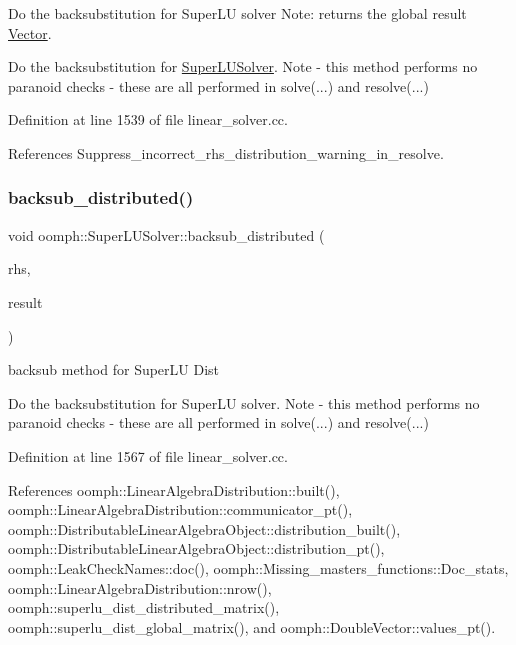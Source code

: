 Do the backsubstitution for Super\+LU solver Note\+: returns the global result \hyperlink{classoomph_1_1Vector}{Vector}. 

Do the backsubstitution for \hyperlink{classoomph_1_1SuperLUSolver}{Super\+L\+U\+Solver}. Note -\/ this method performs no paranoid checks -\/ these are all performed in solve(...) and resolve(...) 

Definition at line 1539 of file linear\+\_\+solver.\+cc.



References Suppress\+\_\+incorrect\+\_\+rhs\+\_\+distribution\+\_\+warning\+\_\+in\+\_\+resolve.

\mbox{\label{classoomph_1_1SuperLUSolver_a6f57fd508b25b730841de735bbea2b17}} 
\subsubsection{\texorpdfstring{backsub\+\_\+distributed()}{backsub\_distributed()}}
{\footnotesize\ttfamily void oomph\+::\+Super\+L\+U\+Solver\+::backsub\+\_\+distributed (\begin{DoxyParamCaption}\item[{const \hyperlink{classoomph_1_1DoubleVector}{Double\+Vector} \&}]{rhs,  }\item[{\hyperlink{classoomph_1_1DoubleVector}{Double\+Vector} \&}]{result }\end{DoxyParamCaption})\hspace{0.3cm}{\ttfamily [private]}}



backsub method for Super\+LU Dist 

Do the backsubstitution for Super\+LU solver. Note -\/ this method performs no paranoid checks -\/ these are all performed in solve(...) and resolve(...) 

Definition at line 1567 of file linear\+\_\+solver.\+cc.



References oomph\+::\+Linear\+Algebra\+Distribution\+::built(), oomph\+::\+Linear\+Algebra\+Distribution\+::communicator\+\_\+pt(), oomph\+::\+Distributable\+Linear\+Algebra\+Object\+::distribution\+\_\+built(), oomph\+::\+Distributable\+Linear\+Algebra\+Object\+::distribution\+\_\+pt(), oomph\+::\+Leak\+Check\+Names\+::doc(), oomph\+::\+Missing\+\_\+masters\+\_\+functions\+::\+Doc\+\_\+stats, oomph\+::\+Linear\+Algebra\+Distribution\+::nrow(), oomph\+::superlu\+\_\+dist\+\_\+distributed\+\_\+matrix(), oomph\+::superlu\+\_\+dist\+\_\+global\+\_\+matrix(), and oomph\+::\+Double\+Vector\+::values\+\_\+pt().

